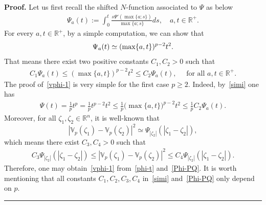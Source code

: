 \documentclass[10pt,a4paper]{amsart}
\newenvironment{proof}[1][Proof]{\textbf{#1.} }{\hfill\rule{0.5em}{0.5em}}
\begin{document}
\begin{proof} 
Let us first recall the shifted $N$-function associated to $\Psi$ as below
\begin{align*}
\Psi_a(t) := \int_0^t \frac{s\Psi'(\max\{a;s\})}{\max\{a;s\}}ds, \quad a, t \in \mathbb{R}^+.
\end{align*}
For every $a, t \in \mathbb{R}^+$, by a simple computation, we can show that
\begin{align}\notag
\Psi_a(t) \simeq (\max\{a,t\})^{p-2}t^2.
\end{align}
That means there exist two positive constants $C_1, C_2>0$ such that
\begin{align}\label{simi}
C_1\Psi_a(t) \le (\max\{a,t\})^{p-2}t^2 \le C_2 \Psi_a(t), \quad \mbox{ for all } a,t \in \mathbb{R}^+.
\end{align}
The proof of~\eqref{vphi-1} is very simple for the first case $p \ge 2$. Indeed, by~\eqref{simi} one has
\begin{align}\label{phi-t}
\Psi(t) = \frac{1}{p}t^p = \frac{1}{p} t^{p-2}t^2 \le \frac{1}{p} \big(\max\{a,t\}\big)^{p-2} t^2 \le \frac{1}{p} C_2\Psi_a(t).
\end{align} 
Moreover, for all $\zeta_1, \zeta_2 \in \mathbb{R}^n$, it is well-known that 
$$|\mathbb{V}_{p}(\zeta_1) - \mathbb{V}_{p}(\zeta_2)|^2 \simeq \Psi_{|\zeta_2|}(|\zeta_1-\zeta_2|),$$ which means there exist $C_3, C_4>0$ such that
\begin{align}\label{Phi-PQ}
C_3\Psi_{|\zeta_2|}(|\zeta_1-\zeta_2|) \le |\mathbb{V}_{p}(\zeta_1) - \mathbb{V}_{p}(\zeta_2)|^2 \le C_4 \Psi_{|\zeta_2|}(|\zeta_1-\zeta_2|).
\end{align}
Therefore, one may obtain~\eqref{vphi-1} from~\eqref{phi-t} and~\eqref{Phi-PQ}. It is worth mentioning that all constants $C_1, C_2, C_3, C_4$ in~\eqref{simi} and~\eqref{Phi-PQ} only depend on $p$. \\


\end{proof}
\end{document}

